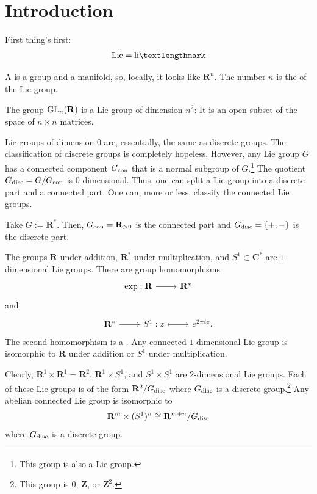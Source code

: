 \documentclass [11 pt, twoside] {article}
\begin{document}
\section {Introduction}
First thing's first:
\begin{align*}
	\textrm{Lie} = \textrm{li\textlengthmark}
\end{align*}

A  is a group and a manifold, so, locally, it looks like $\mathbf{R}^{n}$. The number $n$ is the  of the Lie group.

The group $\operatorname{GL}_{n}(\mathbf{R})$ is a Lie group of dimension $n^{2}$: It is an open subset of the space of $n\times n$ matrices. 

Lie groups of dimension $0$ are, essentially, the same as discrete groups.
The classification of discrete groups is completely hopeless.
However, any Lie group $G$ has a connected component $G_{\textup {con}}$ that is a normal subgroup of $G$.\footnote{This group is also a Lie group.}
The quotient $G_{\textup {disc}} = G/G_{\textup {con}}$ is $0$-dimensional.
Thus, one can split a Lie group into a discrete part and a connected part. One can, more or less, classify the connected Lie groups.

\begin{example}[ ]\label{}\text{}
Take $G:= \mathbf{R}^{*}$. 
Then, $G_{\textup {con}} = \mathbf{R}_{>0}$ is the connected part and $G_{\textup {disc}} = \{+,-\}$ is the discrete part.
\end{example}

The groups $\mathbf{R}$ under addition, $\mathbf{R}^{*}$ under multiplication, and $S^{1}\subset \mathbf{C}^{*}$ are $1$-dimensional Lie groups.
There are group homomorphisms
\[
\begin{tikzcd}
	\exp:\mathbf{R}\ar[r] & \mathbf{R}^{*}
\end{tikzcd}
\]
and
\[
\begin{tikzcd}
	\mathbf{R}^{*}\ar[r] & S^{1} : z\ar[r,mapsto] & e^{2\pi i z}.
\end{tikzcd}
\]
The second homomorphism is a .
Any connected $1$-dimensional Lie group is isomorphic to $\mathbf{R}$ under addition or $S^{1}$ under multiplication.

Clearly, $\mathbf{R}^{1}\times \mathbf{R}^{1} = \mathbf{R}^{2}$, $\mathbf{R}^{1}\times S^{1}$, and $S^{1}\times S^{1}$ are $2$-dimensional Lie groups. 
Each of these Lie groups is of the form $\mathbf{R}^{2}/G_{\textup {disc}}$ where $G_{\textup {disc}}$ is a discrete group.\footnote{This group is $0$, $\mathbf{Z}$, or $\mathbf{Z}^{2}$.}
Any abelian connected Lie group is isomorphic to
\begin{align*}
	\mathbf{R}^{m} \times (S^{1}) ^{n} \cong \mathbf{R}^{m+n}/G_{\textup {disc}}
\end{align*}
where $G_{\textup {disc}}$ is a discrete group.
\end{document}
